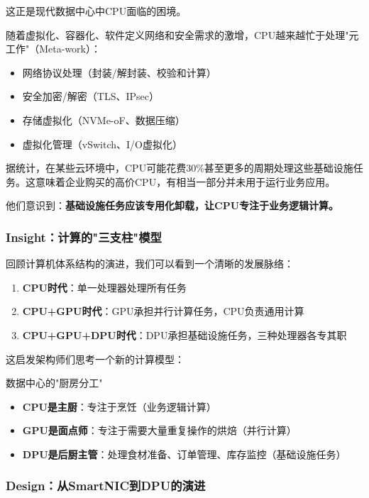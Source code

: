 这正是现代数据中心中CPU面临的困境。

随着虚拟化、容器化、软件定义网络和安全需求的激增，CPU越来越忙于处理"元工作"（Meta-work）：
\begin{itemize}
    \item 网络协议处理（封装/解封装、校验和计算）
    \item 安全加密/解密（TLS、IPsec）
    \item 存储虚拟化（NVMe-oF、数据压缩）
    \item 虚拟化管理（vSwitch、I/O虚拟化）
\end{itemize}

据统计，在某些云环境中，CPU可能花费30\%甚至更多的周期处理这些基础设施任务。这意味着企业购买的高价CPU，有相当一部分并未用于运行业务应用。

他们意识到：\textbf{基础设施任务应该专用化卸载，让CPU专注于业务逻辑计算。}

\subsubsection{Insight：计算的"三支柱"模型}

回顾计算机体系结构的演进，我们可以看到一个清晰的发展脉络：

\begin{enumerate}
    \item \textbf{CPU时代}：单一处理器处理所有任务
    \item \textbf{CPU+GPU时代}：GPU承担并行计算任务，CPU负责通用计算
    \item \textbf{CPU+GPU+DPU时代}：DPU承担基础设施任务，三种处理器各专其职
\end{enumerate}

这启发架构师们思考一个新的计算模型：

\begin{analogy}{数据中心的"厨房分工"}
\begin{itemize}
    \item \textbf{CPU是主厨}：专注于烹饪（业务逻辑计算）
    \item \textbf{GPU是面点师}：专注于需要大量重复操作的烘焙（并行计算）
    \item \textbf{DPU是后厨主管}：处理食材准备、订单管理、库存监控（基础设施任务）
\end{itemize}
\end{analogy}

\subsubsection{Design：从SmartNIC到DPU的演进}

